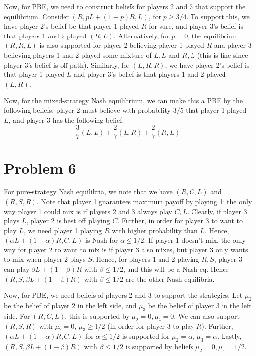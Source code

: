 \documentclass[10pt,letter]{article}
\begin{document}
Now, for PBE, we need to construct beliefs for players 2 and 3 that support the equilibrium. Consider $(R, pL + (1-p)R, L)$, for $p \ge 3/4$. To support this, we have player 2's belief be that player 1 played $R$ for sure, and player 3's belief is that players 1 and 2 played $(R, L)$. Alternatively, for $p = 0$, the equilibrium $(R, R, L)$ is also supported for player 2 believing player 1 played $R$ and player 3 believing players 1 and 2 played some mixture of $L,L$ and $R,L$ (this is fine since player 3's belief is off-path). Similarly, for $(L,R,R)$, we have player 2's belief is that player 1 played $L$ and player 3's belief is that players 1 and 2 played $(L,R)$.

Now, for the mixed-strategy Nash equilibrium, we can make this a PBE by the following beliefs: player 2 must believe with probability $3/5$ that player 1 played $L$, and player 3 has the following belief:
\[ \frac{3}{7}(L,L) + \frac{2}{7}(L,R) + \frac{2}{7}(R,L) \]
\section*{Problem 6}
For pure-strategy Nash equilibria, we note that we have $(R, C, L)$ and $(R, S, R)$. Note that player 1 guarantees maximum payoff by playing 1: the only way player 1 could mix is if players 2 and 3 always play $C, L$. Clearly, if player 3 plays $L$, player 2 is best off playing $C$. Further, in order for player 3 to want to play $L$, we need player 1 playing $R$ with higher probability than $L$. Hence, $(\alpha L + (1-\alpha) R, C, L)$ is Nash for $\alpha \le 1/2$. If player 1 doesn't mix, the only way for player 2 to want to mix is if player 3 also mixes, but player 3 only wants to mix when player 2 plays $S$. Hence, for players 1 and 2 playing $R, S$, player 3 can play $\beta L + (1-\beta)R$ with $\beta \le 1/2$, and this will be a Nash eq.
Hence $(R, S, \beta L + (1-\beta)R)$ with $\beta \le 1/2$ are the other Nash equilibria.

Now, for PBE, we need beliefs of players 2 and 3 to support the strategies. Let $\mu_2$ be the belief of player 2 in the left side, and $\mu_3$ be the belief of player 3 in the left side. For $(R,C,L)$, this is supported by $\mu_2 = 0, \mu_3 = 0$. We can also support $(R,S,R)$ with $\mu_2 = 0$, $\mu_3 \ge 1/2$ (in order for player 3 to play $R$).
Further, $(\alpha L + (1-\alpha) R, C, L)$ for $\alpha \le 1/2$ is supported for $\mu_2 = \alpha$, $\mu_3 = \alpha$. Lastly, $(R, S, \beta L + (1-\beta)R)$ with $\beta \le 1/2$ is supported by beliefs $\mu_2 = 0, \mu_3 = 1/2$.
\end{document}
